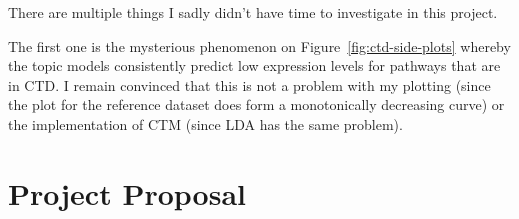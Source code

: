\documentclass[12pt,a4paper,twoside,openright]{report}
\begin{document}
There are multiple things I sadly didn't have time to investigate in this project.

The first one is the mysterious phenomenon on Figure~\ref{fig:ctd-side-plots} whereby the topic models consistently predict low expression levels for pathways that are in CTD. I remain convinced that this is not a problem with my plotting (since the plot for the reference dataset does form a monotonically decreasing curve) or the implementation of CTM (since LDA has the same problem).




\appendix

\chapter{Project Proposal}


\end{document}

